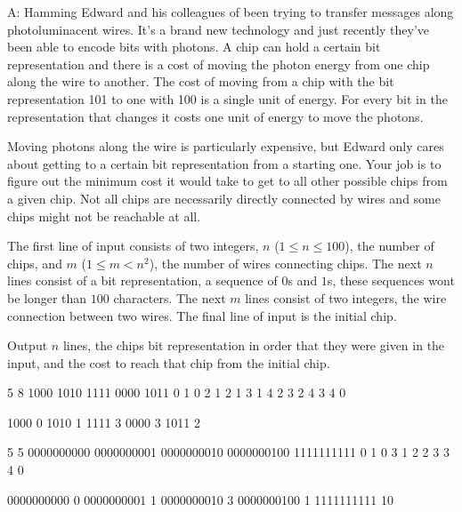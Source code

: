 \begin{problem}{A: Hamming}
Edward and his colleagues of been trying to transfer messages along photoluminacent wires.
It's a brand new technology and just recently they've been able to encode bits with photons.
A chip can hold a certain bit representation and there is a cost of moving the photon energy from one chip along the wire to another.
The cost of moving from a chip with the bit representation 101 to one with 100 is a single unit of energy.
For every bit in the representation that changes it costs one unit of energy to move the photons.

Moving photons along the wire is particularly expensive, but Edward only cares about getting to a certain bit representation from a starting one.
Your job is to figure out the minimum cost it would take to get to all other possible chips from a given chip.
Not all chips are necessarily directly connected by wires and some chips might not be reachable at all.
\end{problem}

\begin{formalin}
The first line of input consists of two integers, $n$ ($1 \leq n \leq 100$), the number of chips, and $m$ ($1 \leq m < n^2$), the number of wires connecting chips.
The next $n$ lines consist of a bit representation, a sequence of $0$s and $1$s, these sequences wont be longer than $100$ characters.
The next $m$ lines consist of two integers, the wire connection between two wires.
The final line of input is the initial chip.
\end{formalin}

\begin{formalout}
Output $n$ lines, the chips bit representation in order that they were given in the input, and the cost to reach that chip from the initial chip.
\end{formalout}

\begin{datain}
5 8
1000
1010
1111
0000
1011
0 1
0 2
1 2
1 3
1 4
2 3
2 4
3 4
0
\end{datain}
\begin{dataout}
1000 0
1010 1
1111 3
0000 3
1011 2
\end{dataout}

\begin{datain}
5 5
0000000000
0000000001
0000000010
0000000100
1111111111
0 1
0 3
1 2
2 3
3 4
0
\end{datain}
\begin{dataout}
0000000000 0
0000000001 1
0000000010 3
0000000100 1
1111111111 10
\end{dataout}
